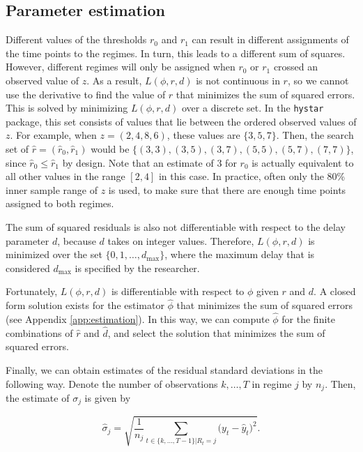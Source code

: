\documentclass{article}
\begin{document}
\subsection{Parameter estimation} 
\label{sec:estimation}
Different values of the thresholds $r_0$ and $r_1$ can result in different assignments of the time points to the regimes. In turn, this leads to a different sum of squares. 
However, different regimes will only be assigned when $r_0$ or $r_1$ crossed an observed value of $z$. 
As a result, $L(\phi, r, d)$ is not continuous in $r$, so we cannot use the derivative to find the value of $r$ that minimizes the sum of squared errors.
This is solved by minimizing $L(\phi, r, d)$ over a discrete set. 
In the \texttt{hystar} package, this set consists of values that lie between the ordered observed values of $z$.
For example, when $z = (2, 4, 8, 6)$, these values are $\{3, 5, 7\}$.
Then, the search set of $\hat{r} = (\hat{r}_0, \hat{r}_1)$ would be $\{(3, 3), (3, 5), (3, 7), (5,5), (5, 7), (7, 7)\}$, since $\hat{r}_0 \le \hat{r}_1$ by design. Note that an estimate of 3 for $r_0$ is actually equivalent to all other values in the range $[2, 4]$ in this case.
In practice, often only the 80\% inner sample range of $z$ is used, to make sure that there are enough time points assigned to both regimes.

The sum of squared residuals is also not differentiable with respect to the delay parameter $d$, because $d$ takes on integer values. Therefore, $L(\phi, r, d)$ is minimized over the set $\{0, 1, \dots, d_{\max}\}$, where the maximum delay that is considered $d_{\max}$ is specified by the researcher.

Fortunately, $L(\phi, r, d)$ is differentiable with respect to $\phi$ given $r$ and $d$. A closed form solution exists for the estimator $\hat{\phi}$ that minimizes the sum of squared errors (see Appendix \ref{app:estimation}). 
In this way, we can compute $\hat{\phi}$ for the finite combinations of $\hat{r}$ and $\hat{d}$, and select the solution that minimizes the sum of squared errors.

Finally, we can obtain estimates of the residual standard deviations in the following way. Denote the number of observations $k, \dots, T$ in regime $j$ by $n_j$. Then, the estimate of $\sigma_{j}$ is given by

\begin{equation}
\hat{\sigma}_{j} = \sqrt{\frac{1}{n_j} \sum_{t \in \{k, \dots, T-1\}| R_t = j} \big(y_t - \hat{y}_t \big)^2}.
\end{equation} 
\end{document}
